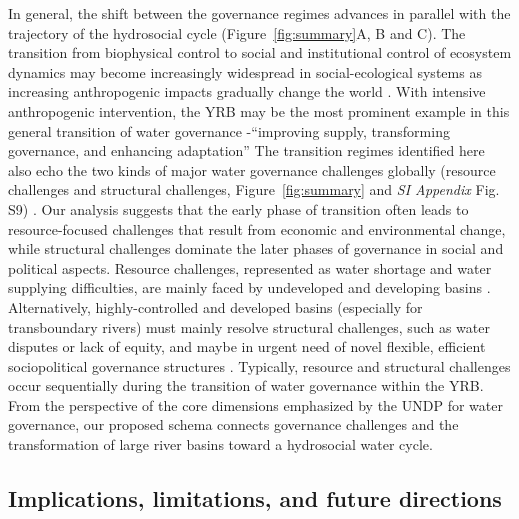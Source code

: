 In general, the shift between the governance regimes advances in parallel with the trajectory of the hydrosocial cycle (Figure~\ref{fig:summary}A, B and C).
The transition from biophysical control to social and institutional control of ecosystem dynamics may become increasingly widespread in social-ecological systems as increasing anthropogenic impacts gradually change the world
\cite{bestPaceHumanInducedChange2020,cummingLinkingeconomicgrowth2018,cummingImplicationsagriculturaltransitions2014}.
With intensive anthropogenic intervention, the YRB may be the most prominent example in this general transition of water governance -``improving supply, transforming governance, and enhancing adaptation'' %
The transition regimes identified here also echo the two kinds of major water governance challenges globally (resource challenges and structural challenges, Figure~\ref{fig:summary} and \textit{SI Appendix} Fig. S9)
\cite{singhWaterGovernanceChallenges2019,porcherFacingChallengesWater2019}.
Our analysis suggests that the early phase of transition often leads to resource-focused challenges that result from economic and environmental change, while structural challenges dominate the later phases of governance in social and political aspects.
Resource challenges, represented as water shortage and water supplying difficulties, are mainly faced by undeveloped and developing basins
\cite{allanNavigatingcomplexitiescoordinated2019,florkeWatercompetitioncities2018,liuWaterSustainabilityChina2012}.
Alternatively, highly-controlled and developed basins (especially for transboundary rivers) must mainly resolve structural challenges, such as water disputes or lack of equity, and maybe in urgent need of novel flexible, efficient sociopolitical governance structures %
\cite{kitroeffThisWarCrossBorder2020,kitroeffThisWarCrossBorder2020,roobavannanRoleSectoralTransformation2017,unep-dhiTransboundaryRiverBasins2016}.
Typically, resource and structural challenges occur sequentially during the transition of water governance within the YRB.
From the perspective of the core dimensions emphasized by the UNDP for water governance, our proposed schema connects governance challenges and the transformation of large river basins toward a hydrosocial water cycle.

\subsection{Implications, limitations, and future directions}
\label{Outlook}

